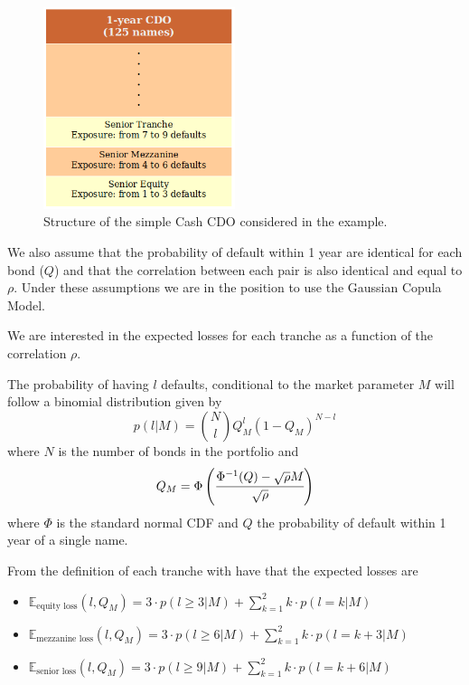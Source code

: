 \begin{figure}[htb]
	\centering
	\includegraphics[width=0.5\textwidth]{figures/ex_cdo_1}
	\caption{Structure of the simple Cash CDO considered in the example.}
	\label{fig:cdo_ex_1}
\end{figure}

We also assume that the probability of default within 1 year are identical for each bond ($Q$) and that the correlation between each pair is also identical and equal to $\rho$.
Under these assumptions we are in the position to use the Gaussian Copula Model. 

We are interested in the expected losses for each tranche as a function of the correlation $\rho$.

The probability of having $l$ defaults, conditional to the market parameter $M$ will follow a binomial distribution given by
\begin{equation}
p(l|M) = \binom{N}{l}Q_M^l (1-Q_M)^{N-l}
\label{eq:def_prob_ex_cdo_1}
\end{equation}
where $N$ is the number of bonds in the portfolio and 
\[
Q_M = \Phi\left(\cfrac{\Phi^{-1}(Q)-\sqrt{\rho}M}{\sqrt{\-\rho}}\right)
\]
where $\Phi$ is the standard normal CDF and $Q$ the probability of default within 1 year of a single name.

From the definition of each tranche with have that the expected losses are
\begin{itemize}
	\item $\mathbb{E}_{\textrm{equity loss}}(l, Q_M)=3\cdot p(l\ge 3|M) + \sum_{k=1}^{2}k\cdot p(l=k|M)$
	\item $\mathbb{E}_{\textrm{mezzanine loss}}(l, Q_M)=3\cdot p(l\ge 6|M) + \sum_{k=1}^{2}k\cdot p(l=k+3|M)$
	\item $\mathbb{E}_{\textrm{senior loss}}(l, Q_M)=3\cdot p(l\ge 9|M) + \sum_{k=1}^{2}k\cdot p(l=k+6|M)$
\end{itemize}
	
